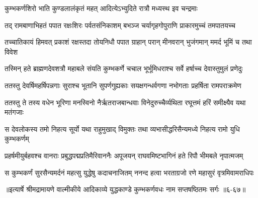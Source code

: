 \twolineshloka
{कुम्भकर्णशिरो भाति कुण्डलालंकृतं महत्}
{आदित्येऽभ्युदिते रात्रौ मध्यस्थ इव चन्द्रमाः} %

\twolineshloka
{तद् रामबाणाभिहतं पपात रक्षःशिरः पर्वतसंनिकाशम्}
{बभञ्ज चर्यागृहगोपुराणि प्राकारमुच्चं तमपातयच्च} %

\twolineshloka
{तच्चातिकायं हिमवत् प्रकाशं रक्षस्तदा तोयनिधौ पपात}
{ग्राहान् परान् मीनवरान् भुजंगमान् ममर्द भूमिं च तथा विवेश} %

\twolineshloka
{तस्मिन् हते ब्राह्मणदेवशत्रौ महाबले संयति कुम्भकर्णे}
{चचाल भूर्भूमिधराश्च सर्वे हर्षाच्च देवास्तुमुलं प्रणेदुः} %

\twolineshloka
{ततस्तु देवर्षिमहर्षिपन्नगाः सुराश्च भूतानि सुपर्णगुह्यकाः}
{सयक्षगन्धर्वगणा नभोगताः प्रहर्षिता रामपराक्रमेण} %

\twolineshloka
{ततस्तु ते तस्य वधेन भूरिणा मनस्विनो नैर्ऋतराजबान्धवाः}
{विनेदुरुच्चैर्व्यथिता रघूत्तमं हरिं समीक्ष्यैव यथा मतंगजाः} %

\twolineshloka
{स देवलोकस्य तमो निहत्य सूर्यो यथा राहुमुखाद् विमुक्तः}
{तथा व्यभासीद्धरिसैन्यमध्ये निहत्य रामो युधि कुम्भकर्णम्} %

\twolineshloka
{प्रहर्षमीयुर्बहवश्च वानराः प्रबुद्धपद्मप्रतिमैरिवाननैः}
{अपूजयन् राघवमिष्टभागिनं हते रिपौ भीमबले नृपात्मजम्} %

\twolineshloka
{स कुम्भकर्णं सुरसैन्यमर्दनं महत्सु युद्धेषु कदाचनाजितम्}
{ननन्द हत्वा भरताग्रजो रणे महासुरं वृत्रमिवामराधिपः} %


॥इत्यार्षे श्रीमद्रामायणे वाल्मीकीये आदिकाव्ये युद्धकाण्डे कुम्भकर्णवधः नाम सप्तषष्ठितमः सर्गः ॥६-६७॥
